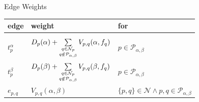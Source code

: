 \documentclass[mathserif]{beamer}
\begin{document}
\begin{frame}{Edge Weights}
    \begin{tabular}{l l l}
        \textbf{edge}       & \textbf{weight}       & \textbf{for}\\[0.2cm]
        \hline \\[0.2cm]
        $t_p^\alpha$ \phantom{blub}        & $D_p(\alpha) + \sum\limits_{\small \substack{q \in \mathcal{N}_p \\q \notin \mathcal{P}_{\alpha,\beta}}} V_{p,q}(\alpha,f_q)$ \phantom{blub} & $p \in \mathcal{P}_{\alpha,\beta}$ \\[0.9cm]
        $t_p^\beta$ \phantom{blub}        & $D_p(\beta) + \sum\limits_{\small \substack{q \in \mathcal{N}_p \\q \notin \mathcal{P}_{\alpha,\beta}}} V_{p,q}(\beta,f_q)$ \phantom{blub} & $p \in \mathcal{P}_{\alpha,\beta}$ \\[0.9cm]
        $e_{p,q}$    & $V_{p,q}(\alpha,\beta)$     & $\{p,q\} \in \mathcal{N} \wedge p,q \in \mathcal{P}_{\alpha,\beta}$
    \end{tabular}
\end{frame}
\end{document}
